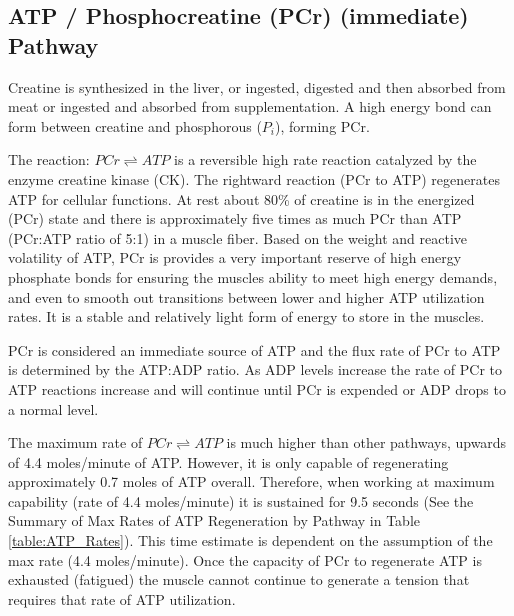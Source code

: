


\subsection{ATP / Phosphocreatine (PCr) (immediate) Pathway}

Creatine is synthesized in the liver, or ingested, digested and then absorbed from meat or ingested and absorbed from supplementation.\footnotemark{} A high energy bond can form between creatine and phosphorous ($P_i$), forming PCr.

The reaction: $PCr \rightleftharpoons ATP$ is a reversible high rate reaction catalyzed by the enzyme creatine kinase (CK). The rightward reaction (PCr to ATP) regenerates ATP for cellular functions. At rest about 80\% of creatine is in the energized (PCr) state and there is approximately five times as much PCr than ATP (PCr:ATP ratio of 5:1) in a muscle fiber. Based on the weight and reactive volatility of ATP, PCr is provides a very important reserve of high energy phosphate bonds for ensuring the muscles ability to meet high energy demands, and even to smooth out transitions between lower and higher ATP utilization rates.\footnotemark{} It is a stable and relatively light form of energy to store in the muscles.

PCr is considered an immediate source of ATP and the flux rate of PCr to ATP is determined by the ATP:ADP ratio. As ADP levels increase the rate of PCr to ATP reactions increase and will continue until PCr is expended or ADP drops to a normal level.

The maximum rate of $PCr \rightleftharpoons ATP$ is much higher than other pathways, upwards of 4.4 moles/minute of ATP. However, it is only capable of regenerating approximately 0.7 moles of ATP overall. Therefore, when working at maximum capability (rate of 4.4 moles/minute) it is sustained for 9.5 seconds (See the Summary of Max Rates of ATP Regeneration by Pathway in Table \ref{table:ATP_Rates}). This time estimate is dependent on the assumption of the max rate (4.4 moles/minute). Once the capacity of PCr to regenerate ATP is exhausted (fatigued) the muscle cannot continue to generate a tension that requires that rate of ATP utilization.

